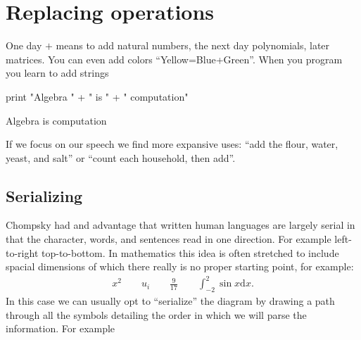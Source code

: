 \section{Replacing operations}
One day  $+$ means to add natural numbers, the next day 
polynomials, later matrices.  
You can even add colors ``Yellow=Blue+Green''. When you program 
you learn to add strings
\begin{center}
\begin{notebookin}
print "Algebra " + " is " + " computation"
\end{notebookin}
\begin{notebookout}
Algebra is computation
\end{notebookout}
\end{center}
If we focus on our 
speech we find more expansive uses:
``add the flour, water, yeast, and salt'' or  
``count each household, then add''.

\subsection{Serializing}
Chompsky had and advantage that written human languages are largely serial in
that the character, words, and sentences read in one direction.  For example
left-to-right top-to-bottom.  In mathematics this idea is often stretched to
include spacial dimensions of which there really is no proper starting point,
for example:
\begin{align*}
    x^2 \qquad u_i \qquad \frac{9}{17}\qquad \int_{-2}^2 \sin x \text{d}x.
\end{align*}
In this case we can usually opt to ``serialize'' the diagram by drawing 
a path through all the symbols detailing the order in which we will parse 
the information.  For example
\begin{center}
\end{center}

